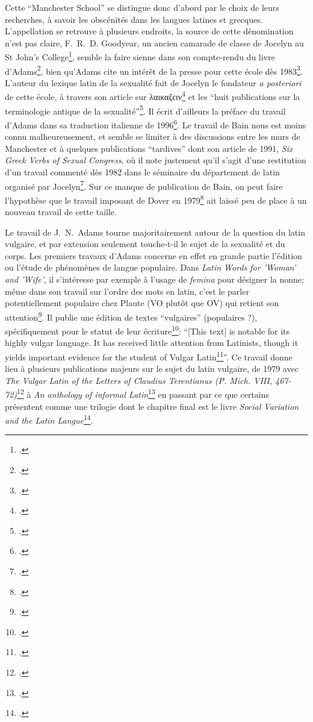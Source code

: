 Cette \enquote{Manchester School} se distingue donc d'abord par le choix de leurs recherches, à savoir les obscénités dans les langues latines et grecques. L'appellation se retrouve à plusieurs endroits, la source de cette dénomination n'est pas claire, F.~R.~D. Goodyear, un ancien camarade de classe de Jocelyn au St John's College\footcite[p.~282]{adams_henry_2003}, semble la faire sienne dans son compte-rendu du livre d'Adams\footcite{goodyear_praefanda_1985}, bien qu'Adams cite un intérêt de la presse pour cette école dès 1983\footcite[p.~289]{adams_henry_2003}. L'auteur du lexique latin de la sexualité fait de Jocelyn le fondateur \textit{a posteriori} de cette école, à travers son article sur λαικαζειν\footcite{jocelyn_greek_1980} et les \enquote{huit publications sur la terminologie antique de la sexualité}\footcite[p.~290]{adams_henry_2003}. Il écrit d'ailleurs la préface du travail d'Adams dans sa traduction italienne de 1996\footcite{adams1996vocabolario}. Le travail de Bain nous est moins connu malheureusement, et semble se limiter à des discussions entre les murs de Manchester et à quelques publications \enquote{tardives} dont son article de 1991, \textit{Six Greek Verbs of Sexual Congress}, où il note justement qu'il s'agit d'une restitution d'un travail commenté dès 1982 dans le séminaire du département de latin organisé par Jocelyn\footcite{bain_six_1991}. Sur ce manque de publication de Bain, on peut faire l'hypothèse que le travail imposant de Dover en 1979\footcite{dover_greek_1979} ait laissé peu de place à un nouveau travail de cette taille.

Le travail de J.~N.~Adams tourne majoritairement autour de la question du latin vulgaire, et par extension seulement touche-t-il le sujet de la sexualité et du corps. Les premiers travaux d'Adams concerne en effet en grande partie l'édition ou l'étude de phénomènes de langue populaire. Dans \textit{Latin Words for 'Woman' and 'Wife'}, il s'intéresse par exemple à l'usage de \textit{femina} pour désigner la nonne; même dans son travail sur l'ordre des mots en latin, c'est le parler potentiellement populaire chez Plaute (VO plutôt que OV) qui retient son attention\footcite[p.~95]{adams_typological_1976}. Il publie une édition de textes \enquote{vulgaires} (populaires ?), spécifiquement pour le statut de leur écriture\footcite{adams_text_1976, }: \enquote{[This text] is notable for its highly vulgar language. It has received little attention from Latinists, though it yields important evidence for the student of Vulgar Latin\footcite[p.~2]{adams1976text}}. Ce travail donne lieu à plusieurs publications majeurs sur le sujet du latin vulgaire, de 1979 avec \textit{The Vulgar Latin of the Letters of Claudius Terentianus (P. Mich. VIII, 467-72)}\footcite{adams_vulgar_1977} à \textit{An anthology of informal Latin}\footcite{adams2016anthology} en passant par ce que certains présentent comme une trilogie dont le chapitre final est le livre \textit{Social Variation and the Latin Langue}\footcite{adams_social_2013}.

